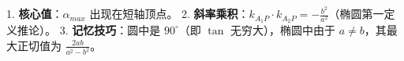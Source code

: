 \begin{summarybox}
1. \textbf{核心值}：$\alpha_{max}$ 出现在短轴顶点。
2. \textbf{斜率乘积}：$k_{A_1P} \cdot k_{A_2P} = -\frac{b^2}{a^2}$（椭圆第一定义推论）。
3. \textbf{记忆技巧}：圆中是 $90^\circ$（即 $\tan$ 无穷大），椭圆中由于 $a \neq b$，其最大正切值为 $\frac{2ab}{a^2-b^2}$。
\end{summarybox}